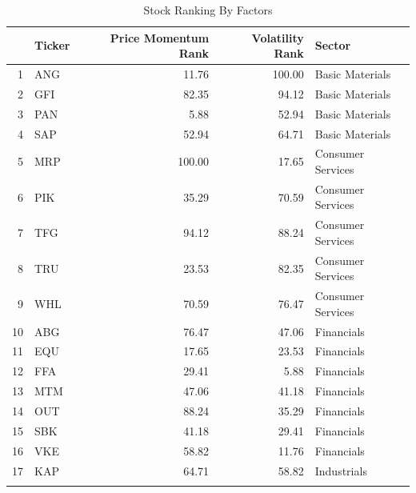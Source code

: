 \documentclass[11pt,preprint, authoryear]{elsarticle}
\numberwithin{equation}{section}
\numberwithin{figure}{section}
\numberwithin{table}{section}
\begin{document}
\begin{longtable}{rlrrl}
  \hline
 & Ticker & Price Momentum Rank & Volatility  Rank & Sector \\ 
  \hline
1 & ANG & 11.76 & 100.00 & Basic Materials \\ 
  2 & GFI & 82.35 & 94.12 & Basic Materials \\ 
  3 & PAN & 5.88 & 52.94 & Basic Materials \\ 
  4 & SAP & 52.94 & 64.71 & Basic Materials \\ 
  5 & MRP & 100.00 & 17.65 & Consumer Services \\ 
  6 & PIK & 35.29 & 70.59 & Consumer Services \\ 
  7 & TFG & 94.12 & 88.24 & Consumer Services \\ 
  8 & TRU & 23.53 & 82.35 & Consumer Services \\ 
  9 & WHL & 70.59 & 76.47 & Consumer Services \\ 
  10 & ABG & 76.47 & 47.06 & Financials \\ 
  11 & EQU & 17.65 & 23.53 & Financials \\ 
  12 & FFA & 29.41 & 5.88 & Financials \\ 
  13 & MTM & 47.06 & 41.18 & Financials \\ 
  14 & OUT & 88.24 & 35.29 & Financials \\ 
  15 & SBK & 41.18 & 29.41 & Financials \\ 
  16 & VKE & 58.82 & 11.76 & Financials \\ 
  17 & KAP & 64.71 & 58.82 & Industrials \\ 
   \hline
\hline
\caption{Stock Ranking By Factors \label{tab1}} 
\end{longtable}
\end{document}
